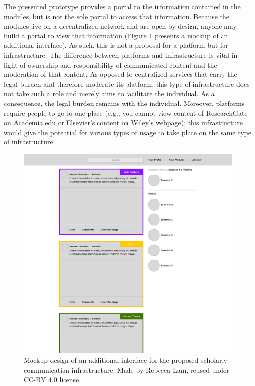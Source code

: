\documentclass[a5paper]{book}
\begin{document}
The presented prototype provides a portal to the information contained
in the modules, but is not the sole portal to access that information.
Because the modules live on a decentralized network and are
open-by-design, anyone may build a portal to view that information
(Figure \ref{fig:datcom-fig6} presents a mockup of an additional
interface). As such, this is not a proposal for a platform but for
infrastructure. The difference between platforms and infrastructure is
vital in light of ownership and responsibility of communicated content
and the moderation of that content. As opposed to centralized services
that carry the legal burden and therefore moderate its platform, this
type of infrastructure does not take such a role and merely aims to
facilitate the individual. As a consequence, the legal burden remains
with the individual. Moreover, platforms require people to go to one
place (e.g., you cannot view content of ResearchGate on Academia.edu or
Elsevier's content on Wiley's webpage); this infrastructure would give
the potential for various types of usage to take place on the same type
of infrastructure.

\begin{figure}
\includegraphics[width=1\linewidth]{assets/figures/datcom-mockup} \caption{Mockup design of an additional interface for the proposed scholarly communication infrastructure. Made by Rebecca Lam, reused under CC-BY 4.0 license.}\label{fig:datcom-fig6}
\end{figure}
\end{document}
